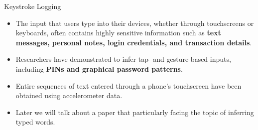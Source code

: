 \documentclass[ucs,9pt,usenames,dvipsnames]{beamer}
\begin{document}
\begin{frame}{Keystroke Logging}
  \begin{itemize}
  	\item The input that users type into their devices, whether through touchscreens or keyboards, often contains highly sensitive information such as \textbf{text messages, personal notes, login credentials, and transaction details}. 
  	\item Researchers have demonstrated to infer tap- and gesture-based inputs, including \textbf{PINs and graphical password patterns}. 
  	\item Entire sequences of text entered through a phone’s touchscreen have been obtained using accelerometer data. 
  	\pause
  	\item \alert{Later we will talk about a paper that particularly facing the topic of inferring typed words.}
  \end{itemize}
\end{frame}
\end{document}
